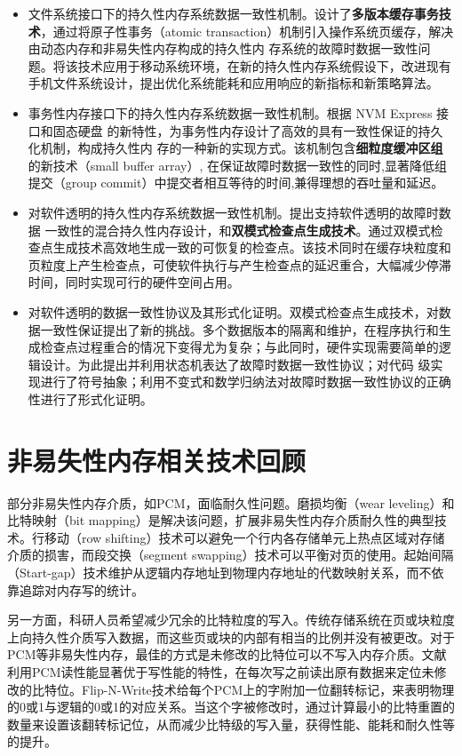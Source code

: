 \begin{itemize}
\item 文件系统接口下的持久性内存系统数据一致性机制。设计了\textbf{多版本缓存事务技术}，通过将原子性事务（atomic transaction）机制引入操作系统页缓存，解决由动态内存和非易失性内存构成的持久性内
存系统的故障时数据一致性问题。将该技术应用于移动系统环境，在新的持久性内存系统假设下，改进现有手机文件系统设计，提出优化系统能耗和应用响应的新指标和新策略算法。
\item 事务性内存接口下的持久性内存系统数据一致性机制。根据 NVM Express 接口和固态硬盘
的新特性，为事务性内存设计了高效的具有一致性保证的持久化机制，构成持久性内
存的一种新的实现方式。该机制包含\textbf{细粒度缓冲区组}的新技术（small buffer array）,
在保证故障时数据一致性的同时,显著降低组提交（group commit）中提交者相互等待的时间,兼得理想的吞吐量和延迟。
\item 对软件透明的持久性内存系统数据一致性机制。提出支持软件透明的故障时数据
一致性的混合持久性内存设计，和\textbf{双模式检查点生成技术}。通过双模式检查点生成技术高效地生成一致的可恢复的检查点。该技术同时在缓存块粒度和页粒度上产生检查点，可使软件执行与产生检查点的延迟重合，大幅减少停滞时间，同时实现可行的硬件空间占用。
\item 对软件透明的数据一致性协议及其形式化证明。双模式检查点生成技术，对数据一致性保证提出了新的挑战。多个数据版本的隔离和维护，在程序执行和生成检查点过程重合的情况下变得尤为复杂；与此同时，硬件实现需要简单的逻辑设计。为此提出并利用状态机表达了故障时数据一致性协议；对代码
级实现进行了符号抽象；利用不变式和数学归纳法对故障时数据一致性协议的正确性进行了形式化证明。
\end{itemize}

\section{非易失性内存相关技术回顾}
\label{sec:nvm-review}

部分非易失性内存介质，如PCM，面临耐久性问题。磨损均衡（wear leveling）和比特映射（bit mapping）是解决该问题，扩展非易失性内存介质耐久性的典型技术。行移动（row shifting）技术可以避免一个行内各存储单元上热点区域对存储介质的损害，而段交换（segment swapping）技术\cite{Qureshi:2009:SHP:1555754.1555760}可以平衡对页的使用\cite{Zhou:2009:DEE:1555754.1555759}。起始间隔（Start-gap）技术\cite{Qureshi:2009:SHP:1555754.1555760}维护从逻辑内存地址到物理内存地址的代数映射关系，而不依靠追踪对内存写的统计。

另一方面，科研人员希望减少冗余的比特粒度的写入。传统存储系统在页或块粒度上向持久性介质写入数据，而这些页或块的内部有相当的比例并没有被更改。对于PCM等非易失性内存，最佳的方式是未修改的比特位可以不写入内存介质。文献\cite{Zhou:2009:DEE:1555754.1555759}利用PCM读性能显著优于写性能的特性，在每次写之前读出原有数据来定位未修改的比特位。Flip-N-Write\cite{5375405}技术给每个PCM上的字附加一位翻转标记，来表明物理的0或1与逻辑的0或1的对应关系。当这个字被修改时，通过计算最小的比特重置的数量来设置该翻转标记位，从而减少比特级的写入量，获得性能、能耗和耐久性等的提升。

